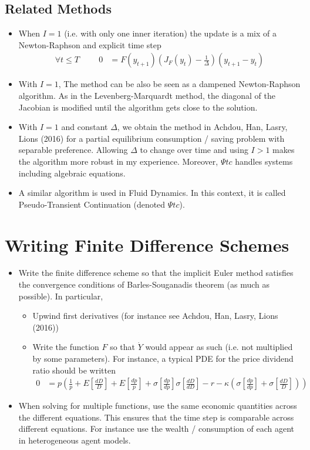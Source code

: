 \documentclass[english]{article}
\begin{document}
\subsection{Related Methods}
	
\begin{itemize}
	\item 
	When $I =1$ (i.e. with only one inner iteration) the update is a mix of a Newton-Raphson and explicit time step
	\begin{align*}
		\forall t \leq T \hspace{1cm} 0&= F(y_{t+1}) (J_{F}(y_t) - \frac{1}{\Delta})(y_{t+1} -y_{t})
	\end{align*}
	\item  With $I=1$, The method can be also be seen as a dampened Newton-Raphson algorithm. As in the Levenberg-Marquardt method, the diagonal of the Jacobian is modified until the algorithm gets close to the solution.
	\item 
	With $I=1$ and constant $\Delta$, we obtain the method in Achdou, Han, Lasry, Lions (2016) for a partial equilibrium consumption / saving  problem with separable preference. Allowing $\Delta$ to change over time and using $I > 1$ makes the algorithm more robust in my experience. Moreover, $\Psi tc$ handles systems including algebraic equations.

	\item 
	A similar algorithm is used in Fluid Dynamics. In this context, it is called Pseudo-Transient Continuation (denoted $\Psi tc$). 

\end{itemize}

\section{Writing Finite Difference Schemes}
\begin{itemize}
	\item 
	Write the finite difference scheme so that the implicit Euler method satisfies the convergence conditions of Barles-Souganadis theorem (as much as possible). In particular,
	\begin{itemize}
		\item Upwind first derivatives (for instance see Achdou, Han, Lasry, Lions (2016))
		\item Write the function $F$ so that $\dot{Y}$ would appear as such (i.e. not multiplied by some parameters). For instance, a typical PDE for the price dividend ratio should be written
		\begin{align*}
			0 &= p (\frac{1}{p} + E[\frac{dD}{D}] + E[\frac{dp}{p}] + \sigma[\frac{dp}{dp}]\sigma[\frac{dD}{dD}] - r - \kappa(\sigma[\frac{dp}{dp}] + \sigma[\frac{dD}{D}]))
		\end{align*}
	\end{itemize}
	\item When solving for multiple functions, use the same economic quantities across the different equations. This ensures that the time step is comparable across different equations. For instance use the wealth / consumption of each agent in heterogeneous agent models. 
\end{itemize}
\end{document}
